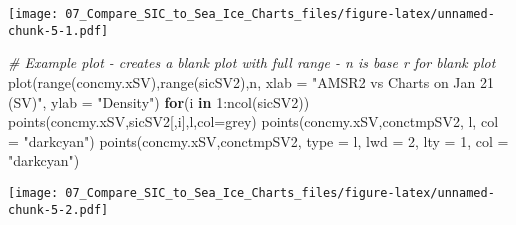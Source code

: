 \documentclass[
]{article}
\newenvironment{Shaded}{\begin{snugshade}}{\end{snugshade}}
\newcommand{\AttributeTok}[1]{\textcolor[rgb]{0.77,0.63,0.00}{#1}}
\newcommand{\CommentTok}[1]{\textcolor[rgb]{0.56,0.35,0.01}{\textit{#1}}}
\newcommand{\ControlFlowTok}[1]{\textcolor[rgb]{0.13,0.29,0.53}{\textbf{#1}}}
\newcommand{\DecValTok}[1]{\textcolor[rgb]{0.00,0.00,0.81}{#1}}
\newcommand{\FunctionTok}[1]{\textcolor[rgb]{0.00,0.00,0.00}{#1}}
\newcommand{\NormalTok}[1]{#1}
\newcommand{\SpecialCharTok}[1]{\textcolor[rgb]{0.00,0.00,0.00}{#1}}
\newcommand{\StringTok}[1]{\textcolor[rgb]{0.31,0.60,0.02}{#1}}
\begin{document}
\texttt{[image: 07\_Compare\_SIC\_to\_Sea\_Ice\_Charts\_files/figure-latex/unnamed-chunk-5-1.pdf]}

\begin{Shaded}
\begin{Highlighting}[]
\CommentTok{\# Example plot {-} creates a blank plot with full range {-} n is base r for blank plot}
\FunctionTok{plot}\NormalTok{(}\FunctionTok{range}\NormalTok{(concmy.xSV),}\FunctionTok{range}\NormalTok{(sicSV2),}\StringTok{\textquotesingle{}n\textquotesingle{}}\NormalTok{, }\AttributeTok{xlab =} \StringTok{"AMSR2 vs Charts on Jan 21 (SV)"}\NormalTok{, }\AttributeTok{ylab =} \StringTok{"Density"}\NormalTok{)}
\ControlFlowTok{for}\NormalTok{(i }\ControlFlowTok{in} \DecValTok{1}\SpecialCharTok{:}\FunctionTok{ncol}\NormalTok{(sicSV2)) }\FunctionTok{points}\NormalTok{(concmy.xSV,sicSV2[,i],}\StringTok{\textquotesingle{}l\textquotesingle{}}\NormalTok{,}\AttributeTok{col=}\StringTok{\textquotesingle{}grey\textquotesingle{}}\NormalTok{)}
\FunctionTok{points}\NormalTok{(concmy.xSV,conctmpSV2, }\StringTok{\textquotesingle{}l\textquotesingle{}}\NormalTok{, }\AttributeTok{col =} \StringTok{"darkcyan"}\NormalTok{)}
\FunctionTok{points}\NormalTok{(concmy.xSV,conctmpSV2, }\AttributeTok{type =} \StringTok{\textquotesingle{}l\textquotesingle{}}\NormalTok{, }\AttributeTok{lwd =} \DecValTok{2}\NormalTok{,  }\AttributeTok{lty =} \DecValTok{1}\NormalTok{, }\AttributeTok{col =} \StringTok{"darkcyan"}\NormalTok{)}
\end{Highlighting}
\end{Shaded}

\texttt{[image: 07\_Compare\_SIC\_to\_Sea\_Ice\_Charts\_files/figure-latex/unnamed-chunk-5-2.pdf]}
\end{document}
